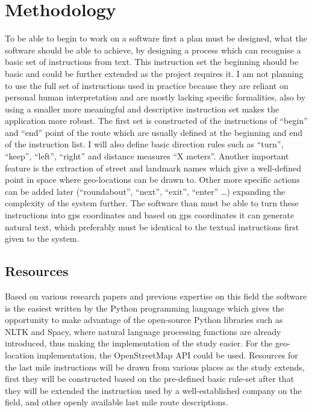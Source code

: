 \section{Methodology}
To be able to begin to work on a software first a plan must be designed, what the software should be able to achieve, by designing a process which can recognise a basic set of instructions from text. This instruction set the beginning should be basic and could be further extended as the project requires it. I am not planning to use the full set of instructions used in practice because they are reliant on personal human interpretation and are mostly lacking specific formalities, also by using a smaller more meaningful and descriptive instruction set makes the application more robust. The first set is constructed of the instructions of “begin” and “end” point of the route which are usually defined at the beginning and end of the instruction list. I will also define basic direction rules such as “turn”, “keep”, “left”, “right” and distance measures “X meters”. Another important feature is the extraction of street and landmark names which give a well-defined point in space where geo-locations can be drawn to. Other more specific actions can be added later (“roundabout”, “next”, “exit”, “enter” …) expanding the complexity of the system further. The software than must be able to turn these instructions into gps coordinates and based on gps coordinates it can generate natural text, which preferably must be identical to the textual instructions first given to the system. 

\subsection{Resources}
Based on various research papers and previous expertise on this field the software is the easiest written by the Python programming language which gives the opportunity to make advantage of the open-source Python libraries such as NLTK and Spacy, where natural language processing functions are already introduced, thus making the implementation of the study easier. For the geo-location implementation, the OpenStreetMap API could be used. Resources for the last mile instructions will be drawn from various places as the study extends, first they will be constructed based on the pre-defined basic rule-set after that they will be extended the instruction used by a well-established company on the field, and other openly available last mile route descriptions. 

